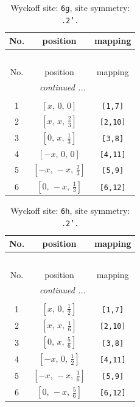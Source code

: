 \documentclass[fleqn,8pt]{jsarticle}
\begin{document}
\renewcommand{\arraystretch}{1.2}
\begin{longtable}{ccc}
\caption{Wyckoff site: {\tt 6g}, site symmetry: {\tt .2'.}}
 \\
 \hline \hline
No. & position & mapping \\ \hline \endfirsthead

\multicolumn{2}{l}{\tablename\ \thetable{}} \\
 \hline \hline
No. & position & mapping \\ \hline \endhead

 \hline \hline
\multicolumn{2}{r}{\footnotesize\it continued ...} \\ \endfoot

 \hline \hline
\multicolumn{2}{r}{} \\ \endlastfoot

1 & $\left[ x,\, 0,\, 0 \right]$ & {\tt [1,7]} \\ \hline
2 & $\left[ x,\, x,\, \frac{2}{3} \right]$ & {\tt [2,10]} \\ \hline
3 & $\left[ 0,\, x,\, \frac{1}{3} \right]$ & {\tt [3,8]} \\ \hline
4 & $\left[ - x,\, 0,\, 0 \right]$ & {\tt [4,11]} \\ \hline
5 & $\left[ - x,\, - x,\, \frac{2}{3} \right]$ & {\tt [5,9]} \\ \hline
6 & $\left[ 0,\, - x,\, \frac{1}{3} \right]$ & {\tt [6,12]} \\
\end{longtable}
\renewcommand{\arraystretch}{1.2}
\begin{longtable}{ccc}
\caption{Wyckoff site: {\tt 6h}, site symmetry: {\tt .2'.}}
 \\
 \hline \hline
No. & position & mapping \\ \hline \endfirsthead

\multicolumn{2}{l}{\tablename\ \thetable{}} \\
 \hline \hline
No. & position & mapping \\ \hline \endhead

 \hline \hline
\multicolumn{2}{r}{\footnotesize\it continued ...} \\ \endfoot

 \hline \hline
\multicolumn{2}{r}{} \\ \endlastfoot

1 & $\left[ x,\, 0,\, \frac{1}{2} \right]$ & {\tt [1,7]} \\ \hline
2 & $\left[ x,\, x,\, \frac{1}{6} \right]$ & {\tt [2,10]} \\ \hline
3 & $\left[ 0,\, x,\, \frac{5}{6} \right]$ & {\tt [3,8]} \\ \hline
4 & $\left[ - x,\, 0,\, \frac{1}{2} \right]$ & {\tt [4,11]} \\ \hline
5 & $\left[ - x,\, - x,\, \frac{1}{6} \right]$ & {\tt [5,9]} \\ \hline
6 & $\left[ 0,\, - x,\, \frac{5}{6} \right]$ & {\tt [6,12]} \\
\end{longtable}
\end{document}
